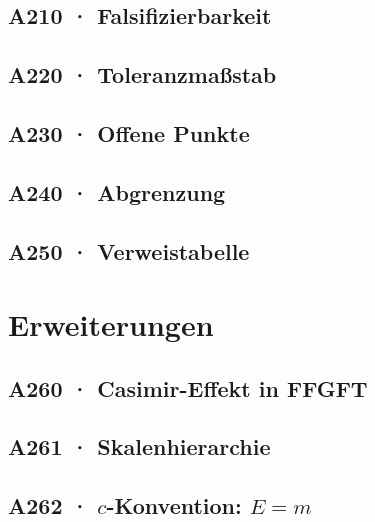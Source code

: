 \documentclass[11pt,twoside,openright]{book}
\begin{document}
\chapter[A210 · Falsifizierbarkeit]{A210 · Falsifizierbarkeit}


\chapter[A220 · Toleranzmaßstab]{A220 · Toleranzmaßstab}


\chapter[A230 · Offene Punkte]{A230 · Offene Punkte}


\chapter[A240 · Abgrenzung]{A240 · Abgrenzung}


\chapter[A250 · Verweistabelle]{A250 · Verweistabelle}


\part{Erweiterungen}

\chapter[A260 · Casimir-Effekt]{A260 · Casimir-Effekt in FFGFT}


\chapter[A261 · Skalenhierarchie]{A261 · Skalenhierarchie}


\chapter[A262 · $c$-Konvention]{A262 · $c$-Konvention: $E=m$}

\end{document}
